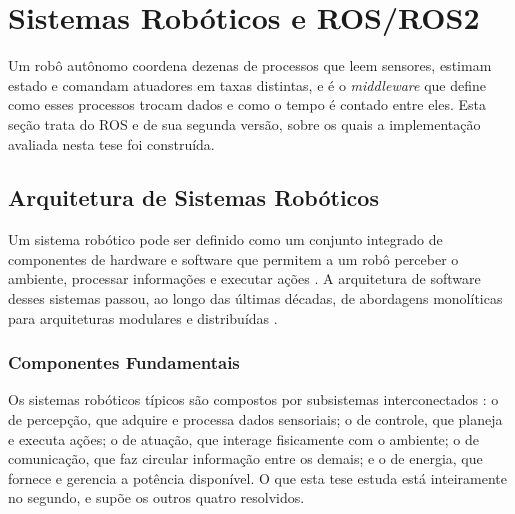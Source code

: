 \section{Sistemas Robóticos e ROS/ROS2}

Um robô autônomo coordena dezenas de processos que leem sensores, estimam estado e comandam atuadores em taxas distintas, e é o \textit{middleware} que define como esses processos trocam dados e como o tempo é contado entre eles. Esta seção trata do \ac{ROS} e de sua segunda versão, sobre os quais a implementação avaliada nesta tese foi construída.

\subsection{Arquitetura de Sistemas Robóticos}

Um sistema robótico pode ser definido como um conjunto integrado de componentes de hardware e software que permitem a um robô perceber o ambiente, processar informações e executar ações \cite{Siegwart2011}. A arquitetura de software desses sistemas passou, ao longo das últimas décadas, de abordagens monolíticas para arquiteturas modulares e distribuídas \cite{Kortenkamp2016}.

\subsubsection{Componentes Fundamentais}

Os sistemas robóticos típicos são compostos por subsistemas interconectados
\cite{Siegwart2011, Kortenkamp2016}: o de percepção, que adquire e processa dados
sensoriais; o de controle, que planeja e executa ações; o de atuação, que interage
fisicamente com o ambiente; o de comunicação, que faz circular informação entre os
demais; e o de energia, que fornece e gerencia a potência disponível. O que esta tese
estuda está inteiramente no segundo, e supõe os outros quatro resolvidos.

